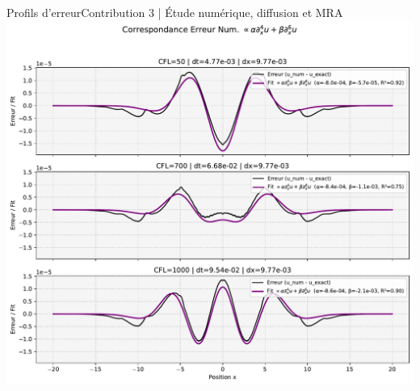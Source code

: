 \begin{frame}{Profils d'erreur}{Contribution 3 | Étude numérique, diffusion et MRA}
    \centering
    \includegraphics[height= .85\textheight]{medias/2_/3_/derivees_spatiales_VS_err_num.pdf}
    
\end{frame}